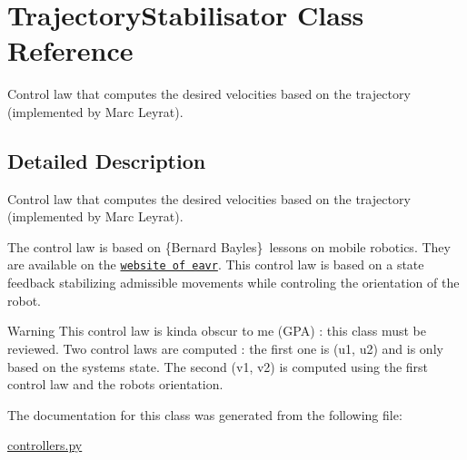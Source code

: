 \hypertarget{classTrajectoryStabilisator}{}\section{Trajectory\+Stabilisator Class Reference}
\label{classTrajectoryStabilisator}


Control law that computes the desired velocities based on the trajectory (implemented by Marc Leyrat).  




\subsection{Detailed Description}
Control law that computes the desired velocities based on the trajectory (implemented by Marc Leyrat). 

The control law is based on {\itshape }\{Bernard Bayle\textquotesingle{}s\} lessons on mobile robotics. They are available on the \href{http://eavr.u-strasbg.fr/~bernard/education/3a_robmob/3a_robmob.html}{\tt website of eavr}. This control law is based on a state feedback stabilizing admissible movements while controling the orientation of the robot. \begin{DoxyWarning}{Warning}
This control law is kinda obscur to me (G\+PA) \+: this class must be reviewed. Two control laws are computed \+: the first one is (u1, u2) and is only based on the system\textquotesingle{}s state. The second (v1, v2) is computed using the first control law and the robot\textquotesingle{}s orientation. 
\end{DoxyWarning}


The documentation for this class was generated from the following file\+:\begin{DoxyCompactItemize}
\item 
\hyperlink{controllers_8py}{controllers.\+py}\end{DoxyCompactItemize}
